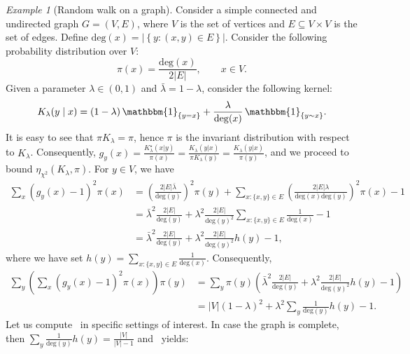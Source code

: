 \documentclass[11pt]{article}
\theoremstyle{plain}
\theoremstyle{remark}
\newtheorem{example}{Example}
\begin{document}
\begin{example}[Random walk on a graph]\label{ex:graph}
    Consider a simple connected and undirected graph $G = (V,E)$, where $V$ is the set of vertices and $E\subseteq V\times V$ is the set of edges. Define $\mathrm{deg}(x)=|\left\{ y : (x,y) \in E \right\}|$. Consider the following probability distribution over $V$:
    \begin{equation}
        \pi(x) = \frac{\mathrm{deg}(x)}{2|E|}, \qquad x \in V.
    \end{equation}
    Given a parameter $\lambda \in (0,1)$  and $\bar{\lambda}=1-\lambda$, consider the following kernel:
 \begin{equation}
K_\lambda(y\mid x)
=
(1-\lambda)\,\mathbbm{1}_{\{y=x\}}
+
\frac{\lambda}{\deg(x)}\,\mathbbm{1}_{\{y\sim x\}}.
\end{equation}
    It is easy to see that $\pi K_\lambda = \pi$, hence $\pi$ is the invariant distribution with respect to $K_\lambda$. Consequently, $g_y(x) =  \frac{K^\star_\lambda(x|y)}{\pi(x)} = \frac{K_\lambda(y|x)}{\pi K_\lambda(y)} = \frac{K_\lambda(y|x)}{\pi(y)}$, and we proceed to bound $\eta_{\chi^2}(K_\lambda, \pi)$. For $y \in V$, we have
    \begin{align}
        \sum_{x} (g_y(x)-1)^2 \pi(x)   &=
        \left(\frac{2|E| \bar{\lambda}}{\mathrm{deg}(y)}\right)^2 \pi(y) + \sum_{x: \{x,y\}\in E} \left( \frac{2|E|\lambda}{\mathrm{deg}(x)\mathrm{deg}(y) } \right)^2 \pi(x) - 1 \\
        &= \bar{\lambda}^2 \frac{2|E|}{\mathrm{deg}(y)} +  \lambda^2 \frac{2|E|}{\mathrm{deg}(y)^2}  \sum_{x: \{x,y\}\in E} \frac{1}{\mathrm{deg}(x)} - 1 \\
        &= \bar{\lambda}^2 \frac{2|E|}{\mathrm{deg}(y)} +  \lambda^2 \frac{2|E|}{\mathrm{deg}(y)^2}h(y) - 1,
    \end{align}
    where we have set $h(y)=\sum_{x: \{x,y\}\in E} \frac{1}{\mathrm{deg}(x)}$.
    Consequently,
    \begin{align}
        \sum_y \left(\sum_{x} (g_y(x)-1)^2 \pi(x)\right) \pi(y) &= \sum_y \pi(y) \left(\bar{\lambda}^2 \frac{2|E|}{\mathrm{deg}(y)} +  \lambda^2 \frac{2|E|}{\mathrm{deg}(y)^2}h(y) - 1\right) \\
        &= |V|(1-\lambda)^2+ \lambda^2 \sum_{y} \frac{1}{\mathrm{deg}(y)}h(y) - 1. \label{eq:boundEtaChiGraph}
    \end{align}
    Let us compute~ in specific settings of interest. 
    In case the graph is complete, then $\sum_y \frac{1}{\mathrm{deg}(y)}h(y) = \frac{|V|}{|V|-1}$ and~ yields:

\end{example}
\end{document}
